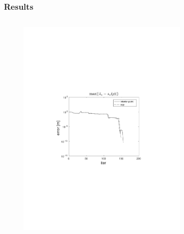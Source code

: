 \documentclass{beamer}
\begin{document}
\begin{frame}
    \frametitle{Results}

    \begin{columns}[t]
            \begin{figure}
                \centering
                \includegraphics[trim=4cm 9cm 4cm 8.5cm, clip=true, width=\linewidth]{img/convPlotS_ref2}
            \end{figure}
            \begin{figure}
                \centering

\end{figure}
\end{columns}
\end{frame}
\end{document}
